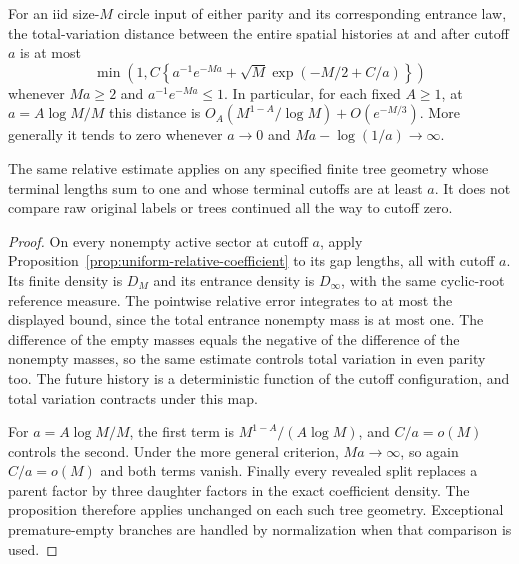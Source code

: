 \documentclass[11pt,letterpaper]{article}
\begin{document}
\begin{theorem}
\label{thm:near-microscopic-TV}
For an iid size-$M$ circle input of either parity and its
corresponding entrance law, the total-variation distance between
the entire spatial histories at and after cutoff $a$ is at most
\begin{equation}\label{eq:near-microscopic-TV}
 \min\left(1,C\left\{a^{-1}e^{-Ma}
             +\sqrt M\exp(-M/2+C/a)\right\}\right)
\end{equation}
whenever $Ma\ge2$ and $a^{-1}e^{-Ma}\le1$.
In particular, for each fixed $A\ge1$, at
$a=A\log M/M$ this distance is
$O_A(M^{1-A}/\log M)+O(e^{-M/3})$.
More generally it tends to zero whenever $a\to0$ and
$Ma-\log(1/a)\to\infty$.

The same relative estimate applies on any specified finite tree
geometry whose terminal lengths sum to one and whose terminal
cutoffs are at least $a$. It does not compare raw original labels
or trees continued all the way to cutoff zero.
\end{theorem}
\begin{proof}
On every nonempty active sector at cutoff $a$, apply
Proposition~\ref{prop:uniform-relative-coefficient} to its gap
lengths, all with cutoff $a$. Its finite density is $D_M$ and
its entrance density is $D_\infty$, with the same cyclic-root
reference measure. The pointwise relative error integrates to
at most the displayed bound, since the total entrance nonempty
mass is at most one. The difference of the empty masses equals
the negative of the difference of the nonempty masses, so the
same estimate controls total variation in even parity too.
The future history is a deterministic function of the cutoff
configuration, and total variation contracts under this map.

For $a=A\log M/M$, the first term is
$M^{1-A}/(A\log M)$, and $C/a=o(M)$ controls the second.
Under the more general criterion, $Ma\to\infty$, so again
$C/a=o(M)$ and both terms vanish. Finally every revealed split
replaces a parent factor by three daughter factors in the exact
coefficient density. The proposition therefore applies unchanged
on each such tree geometry. Exceptional premature-empty branches
are handled by normalization when that comparison is used.
\end{proof}
\end{document}
